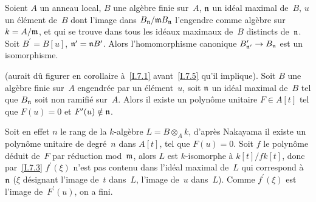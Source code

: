 \begin{lemme}
\label{I.7.9}
Soient $A$ un anneau local, $B$ une alg\`ebre finie sur~$A$,
$\mathfrak{n}$ un id\'eal maximal de~$B$, $u$ un \'el\'ement de~$B$
dont l'image dans $B_\mathfrak{n}/\mathfrak{m} B_\mathfrak{n}$ l'engendre comme
alg\`ebre sur~$k = A/\mathfrak{m}$, et qui se trouve dans tous les
id\'eaux maximaux de~$B$ distincts de~$\mathfrak{n}$. Soit $B^\prime =
B[u]$, $\mathfrak{n}^\prime = \mathfrak{n} B^\prime$. Alors l'homomorphisme
canonique $B^\prime_{\goth{n}^\prime} \to B_\goth{n}$ est un
isomorphisme.
\end{lemme}

\begin{lemme}
\label{I.7.10}
(aurait d\^u figurer en corollaire \`a~\ref{I.7.1}
avant~\ref{I.7.5} qu'il implique). Soit $B$ une alg\`ebre finie
sur~$A$ engendr\'ee par un \'el\'ement~$u$, soit $\mathfrak{n}$ un
id\'eal maximal de~$B$ tel que $B_\mathfrak{n}$ soit non ramifi\'e
sur~$A$. Alors il existe un polyn\^ome unitaire $F \in A[t]$ tel que
$F(u) = 0$ et $F^\prime(u) \notin \mathfrak{n}$.
\end{lemme}

Soit en effet $n$ le rang de la $k$-alg\`ebre $L = B \otimes_A k$,
d'apr\`es Nakayama il existe un polyn\^ome unitaire de
degr\'e~$n$ dans $A[t]$, tel que $F(u) = 0$. Soit $f$ le
polyn\^ome d\'eduit de~$F$ par r\'eduction mod~$\mathfrak{m}$, alors
$L$ est $k$-isomorphe \`a $k[t]/fk[t]$, donc par~\ref{I.7.3}
$f^\prime(\xi)$ n'est pas contenu dans l'id\'eal maximal de~$L$ qui
correspond \`a~$\mathfrak{n}$ ($\xi$ d\'esignant l'image de~$t$
dans~$L$, \ie l'image de~$u$ dans~$L$). Comme $f^\prime(\xi)$ est
l'image de~$F^\prime(u)$, on a fini.

